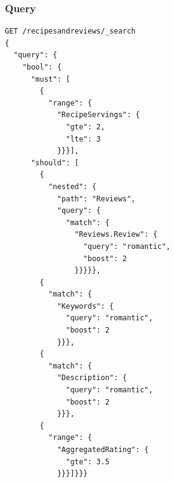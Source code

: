 \begin{enumerate}
    \subsubsection{Query}
    \begin{verbatim}
GET /recipesandreviews/_search
{
  "query": {
    "bool": {
      "must": [
        {
          "range": {
            "RecipeServings": {
              "gte": 2,
              "lte": 3
            }}}],
      "should": [
        {
          "nested": {
            "path": "Reviews",
            "query": {
              "match": {
                "Reviews.Review": {
                  "query": "romantic",
                  "boost": 2
                }}}}},
        {
          "match": {
            "Keywords": {
              "query": "romantic",
              "boost": 2
            }}},
        {
          "match": {
            "Description": {
              "query": "romantic",
              "boost": 2
            }}},
        {
          "range": {
            "AggregatedRating": {
              "gte": 3.5
            }}}]}}}

    \end{verbatim}

\end{enumerate}

